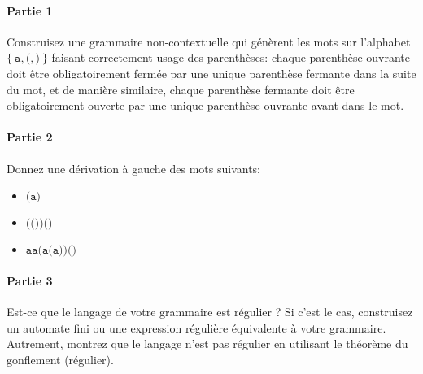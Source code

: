 \documentclass[12pt,french,a4paper]{article}
\begin{document}
\begin{question}

\paragraph{Partie 1}

Construisez une grammaire non-contextuelle qui génèrent les mots sur l'alphabet $\{\ \texttt{a}, \texttt{(}, \texttt{)}\ \}$ faisant correctement usage des parenthèses: chaque parenthèse ouvrante doit être obligatoirement fermée par une unique parenthèse fermante dans la suite du mot, et de manière similaire, chaque parenthèse fermante doit être obligatoirement ouverte par une unique parenthèse ouvrante avant dans le mot. 

\paragraph{Partie 2}

Donnez une dérivation à gauche des mots suivants:
\begin{itemize}
\item $\texttt{(a)}$
\item $\texttt{(())()}$
\item $\texttt{aa(a(a))()}$
\end{itemize}

\paragraph{Partie 3}

Est-ce que le langage de votre grammaire est régulier ?
Si c'est le cas, construisez un automate fini ou une expression régulière équivalente à votre grammaire.
Autrement, montrez que le langage n'est pas régulier en utilisant le théorème du gonflement (régulier).

\end{question}

\vspace{2cm}
\end{document}
